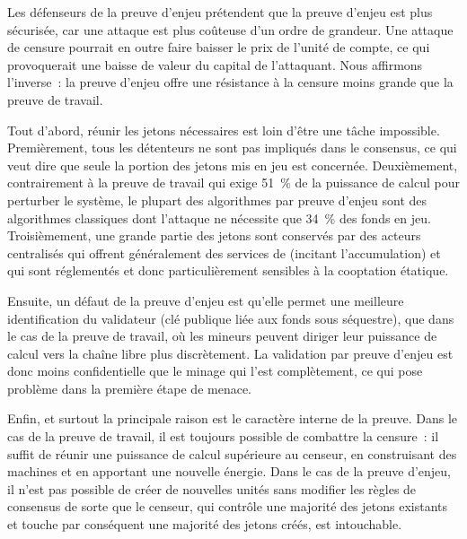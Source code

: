 
Les défenseurs de la preuve d'enjeu prétendent que la preuve d'enjeu est plus sécurisée, car une attaque est plus coûteuse d'un ordre de grandeur. Une attaque de censure pourrait en outre faire baisser le prix de l'unité de compte, ce qui provoquerait une baisse de valeur du capital de l'attaquant. Nous affirmons l'inverse~: la preuve d'enjeu offre une résistance à la censure moins grande que la preuve de travail.

Tout d'abord, réunir les jetons nécessaires est loin d'être une tâche impossible. Premièrement, tous les détenteurs ne sont pas impliqués dans le consensus, ce qui veut dire que seule la portion des jetons mis en jeu est concernée. Deuxièmement, contrairement à la preuve de travail qui exige 51~\% de la puissance de calcul pour perturber le système, le plupart des algorithmes par preuve d'enjeu sont des algorithmes classiques dont l'attaque ne nécessite que 34~\% des fonds en jeu. Troisièmement, une grande partie des jetons sont conservés par des acteurs centralisés qui offrent généralement des services de  (incitant l'accumulation) et qui sont réglementés et donc particulièrement sensibles à la cooptation étatique.

Ensuite, un défaut de la preuve d'enjeu est qu'elle permet une meilleure identification du validateur (clé publique liée aux fonds sous séquestre), que dans le cas de la preuve de travail, où les mineurs peuvent diriger leur puissance de calcul vers la chaîne libre plus discrètement. La validation par preuve d'enjeu est donc moins confidentielle que le minage qui l'est complètement, ce qui pose problème dans la première étape de menace.

Enfin, et surtout la principale raison est le caractère interne de la preuve. Dans le cas de la preuve de travail, il est toujours possible de combattre la censure~: il suffit de réunir une puissance de calcul supérieure au censeur, en construisant des machines et en apportant une nouvelle énergie. Dans le cas de la preuve d'enjeu, il n'est pas possible de créer de nouvelles unités sans modifier les règles de consensus de sorte que le censeur, qui contrôle une majorité des jetons existants et touche par conséquent une majorité des jetons créés, est intouchable.


